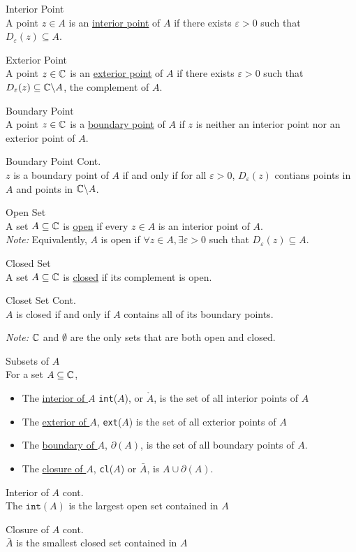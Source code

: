 \documentclass[10pt]{paper}
\newcommand{\gspc}{\vspace{0.13cm}} %
\newcommand{\gline}[0]{\gspc\\} %
\newcommand{\ul}[1]{\underline{#1}}
\begin{document}
\begin{definition}{Interior Point}{}\gline{}
  A point $z\in A$ is an \ul{interior point} of $A$ if there exists $\varepsilon > 0$ such that $D_\varepsilon(z) \subseteq A$.
\end{definition}
\begin{definition}{Exterior Point}{}\gline{}
  A point $z\in\mathbb{C}$ is an \ul{exterior point} of $A$ if there exists $\varepsilon > 0$ such that $D_\varepsilon(z)\subseteq \mathbb{C}\backslash A$, the complement of $A$.
\end{definition}
\begin{definition}{Boundary Point}{}\gline{}
  A point $z\in\mathbb{C}$ is a \ul{boundary point} of $A$ if $z$ is neither an interior point nor an exterior point of $A$. 
  \begin{theorem}{Boundary Point Cont.}{}\gline{}
    $z$ is a boundary point of $A$ if and only if for all $\varepsilon > 0$, $D_\varepsilon(z)$ contians points in $A$ and points in $\mathbb{C}\backslash A$.
  \end{theorem}
\end{definition}
\begin{definition}{Open Set}{}\gline{}
  A set $A\subseteq\mathbb{C}$ is \ul{open} if every $z\in A $ is an interior point of $A$.\gline{}
  \textit{Note:} Equivalently, $A$ is open if $\forall z\in A, \exists\varepsilon > 0$ such that $D_\varepsilon(z)\subseteq A$. 
\end{definition}
\begin{definition}{Closed Set}{}\gline{}
  A set $A\subseteq \mathbb{C}$ is \ul{closed} if its complement is open.
  \begin{theorem}{Closet Set Cont.}{}\gline{}
    $A$ is closed if and only if $A$ contains all of its boundary points. 
  \end{theorem}
  \textit{Note:} $\mathbb{C}$ and $\emptyset$ are the only sets that are both open and closed. 
\end{definition}
\begin{definition}{Subsets of $A$}{}\gline{}
  For a set $A\subseteq \mathbb{C}$,
  \begin{itemize}
    \item The \ul{interior of $A$} \texttt{int}($A$), or $\mathring{A}$, is the set of all interior points of $A$
    \item The \ul{exterior of $A$}, \texttt{ext}($A$) is the set of all exterior points of $A$
    \item The \ul{boundary of $A$}, $\partial(A)$, is the set of all boundary points of $A$.
    \item The \ul{closure of $A$}, \texttt{cl}($A$) or $\bar A$, is $A\cup \partial(A)$. 
  \end{itemize}
  \begin{theorem}{Interior of $A$ cont.}{}\gline{}
    The $\texttt{int}(A)$ is the largest open set contained in $A$
  \end{theorem}
  \begin{theorem}{Closure of $A$ cont.}{}\gline{}
     $\bar A$ is the smallest closed set contained in $A$
  \end{theorem}
\end{definition}
\end{document}
